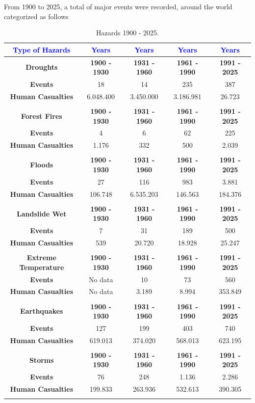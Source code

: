 \documentclass[12pt]{Definitions/academia}
\begin{document}
From 1900 to 2025, a total of major events were recorded, around the
world categorized as follows 

\begin{table}[H]
\begin{tabular}{|c|c|c|c|c|}
\hline
\textbf{\textcolor{blue}{Type of Hazards}} & \textbf{\textcolor{blue}{Years}} & \textbf{\textcolor{blue}{Years}} & \textbf{\textcolor{blue}{Years}} & \textbf{\textcolor{blue}{Years}}\tabularnewline
\hline
\hline
\textbf{Droughts} & \textbf{1900 - 1930} & \textbf{1931 - 1960} & \textbf{1961 - 1990} & \textbf{1991 - 2025}\tabularnewline
\hline
\textbf{Events} & 18 & 14 & 235 & 387\tabularnewline
\hline
\textbf{Human Casualties} & 6.048.400 & 3.450.000 & 3.186.981 & 26.723\tabularnewline
\hline
 &  &  &  & \tabularnewline
\hline
\textbf{Forest Fires} & \textbf{1900 - 1930} & \textbf{1931 - 1960} & \textbf{1961 - 1990} & \textbf{1991 - 2025}\tabularnewline
\hline
\textbf{Events} & 4 & 6 & 62 & 225\tabularnewline
\hline
\textbf{Human Casualties} & 1.176 & 332 & 500 & 2.039\tabularnewline
\hline
 &  &  &  & \tabularnewline
\hline
\textbf{Floods} & \textbf{1900 - 1930} & \textbf{1931 - 1960} & \textbf{1961 - 1990} & \textbf{1991 - 2025}\tabularnewline
\hline
\textbf{Events} & 27 & 116 & 983 & 3.881\tabularnewline
\hline
\textbf{Human Casualties} & 106.748 & 6.535.203 & 146.563 & 184.376\tabularnewline
\hline
 &  &  &  & \tabularnewline
\hline
\textbf{Landslide Wet} & \textbf{1900 - 1930} & \textbf{1931 - 1960} & \textbf{1961 - 1990} & \textbf{1991 - 2025}\tabularnewline
\hline
\textbf{Events} & 7 & 31 & 189 & 500\tabularnewline
\hline
\textbf{Human Casualties} & 539 & 20.720 & 18.928 & 25.247\tabularnewline
\hline
 &  &  &  & \tabularnewline
\hline
\textbf{Extreme Temperature} & \textbf{1900 - 1930} & \textbf{1931 - 1960} & \textbf{1961 - 1990} & \textbf{1991 - 2025}\tabularnewline
\hline
\textbf{Events} & No data & 10 & 73 & 560\tabularnewline
\hline
\textbf{Human Casualties} & No data & 3.189 & 8.994 & 353.849\tabularnewline
\hline
 &  &  &  & \tabularnewline
\hline
\textbf{Earthquakes} & \textbf{1900 - 1930} & \textbf{1931 - 1960} & \textbf{1961 - 1990} & \textbf{1991 - 2025}\tabularnewline
\hline
\textbf{Events} & 127 & 199 & 403 & 740\tabularnewline
\hline
\textbf{Human Casualties} & 619.013 & 374.020 & 568.013 & 623.195\tabularnewline
\hline
 &  &  &  & \tabularnewline
\hline
\textbf{Storms} & \textbf{1900 - 1930} & \textbf{1931 - 1960} & \textbf{1961 - 1990} & \textbf{1991 - 2025}\tabularnewline
\hline
\textbf{Events} & 76 & 248 & 1.136 & 2.286\tabularnewline
\hline
\textbf{Human Casualties} & 199.833 & 263.936 & 532.613 & 390.305\tabularnewline
\hline
 &  &  &  & \tabularnewline
\hline
\end{tabular}

\caption{Hazards 1900 - 2025.\label{tab:Table-1-Hazards-1900--}}

\end{table}
\end{document}

